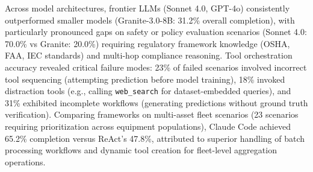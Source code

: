 \documentclass[sigconf, screen, nonacm]{acmart}
\begin{document}
  Across 
  model architectures, frontier LLMs (Sonnet 4.0, GPT-4o) consistently       
  outperformed smaller models (Granite-3.0-8B: 31.2\% overall completion),   
  with particularly pronounced gaps on safety or policy evaluation scenarios    
  (Sonnet 4.0: 70.0\% vs Granite: 20.0\%) requiring regulatory framework     
  knowledge (OSHA, FAA, IEC standards) and multi-hop compliance reasoning.   
  Tool orchestration accuracy revealed critical failure modes: 23\% of failed
   scenarios involved incorrect tool sequencing (attempting prediction before
   model training), 18\% invoked distraction tools (e.g., calling            
  \texttt{web\_search} for dataset-embedded queries), and 31\% exhibited     
  incomplete workflows (generating predictions without ground truth          
  verification). Comparing frameworks on multi-asset fleet scenarios (23     
  scenarios requiring prioritization across equipment populations), Claude   
  Code achieved 65.2\% completion versus ReAct's 47.8\%, attributed to       
  superior handling of batch processing workflows and dynamic tool creation  
  for fleet-level aggregation operations.                                    
                                                                             
  \begin{table}[t]
    \caption{Framework and model performance across PHM task categories.
  Completion rates represent percentage of scenarios producing valid outputs
  matching ground truth criteria. Best results per category in
  \textbf{bold}.}
    \label{tab:framework_performance}
    \centering
    \small
    \end{table}                                                              
                                                                             
\end{document}
